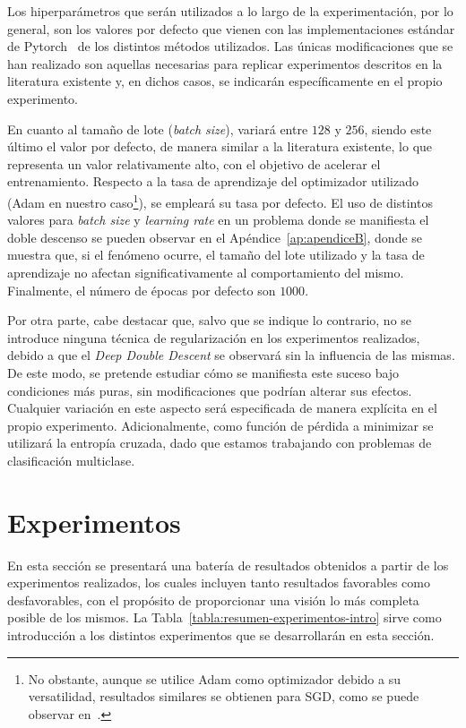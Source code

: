 Los hiperparámetros que serán utilizados a lo largo de la experimentación, por lo general, son los valores por defecto que vienen con las implementaciones estándar de Pytorch~\cite{NEURIPS2019_9015} de los distintos métodos utilizados. Las únicas modificaciones que se han realizado son aquellas necesarias para replicar experimentos descritos en la literatura existente y, en dichos casos, se indicarán específicamente en el propio experimento.

En cuanto al tamaño de lote (\textit{batch size}), variará entre $128$ y $256$, siendo este último el valor por defecto, de manera similar a la literatura existente, lo que representa un valor relativamente alto, con el objetivo de acelerar el entrenamiento. Respecto a la tasa de aprendizaje del optimizador utilizado (Adam en nuestro caso\footnote{No obstante, aunque se utilice Adam como optimizador debido a su versatilidad, resultados similares se obtienen para SGD, como se puede observar en~\cite{Nakkiran2019}.}), se empleará su tasa por defecto. El uso de distintos valores para \textit{batch size} y \textit{learning rate} en un problema donde se manifiesta el doble descenso se pueden observar en el Apéndice~\ref{ap:apendiceB}, donde se muestra que, si el fenómeno ocurre, el tamaño del lote utilizado y la tasa de aprendizaje no afectan significativamente al comportamiento del mismo. Finalmente, el número de épocas por defecto son $1000$.

Por otra parte, cabe destacar que, salvo que se indique lo contrario, no se introduce ninguna técnica de regularización en los experimentos realizados, debido a que el \textit{Deep Double Descent} se observará sin la influencia de las mismas. De este modo, se pretende estudiar cómo se manifiesta este suceso bajo condiciones más puras, sin modificaciones que podrían alterar sus efectos. Cualquier variación en este aspecto será especificada de manera explícita en el propio experimento. Adicionalmente, como función de pérdida a minimizar se utilizará la entropía cruzada, dado que estamos trabajando con problemas de clasificación multiclase.

\section{Experimentos}\label{sec:experimentos}

En esta sección se presentará una batería de resultados obtenidos a partir de los experimentos realizados, los cuales incluyen tanto resultados favorables como desfavorables, con el propósito de proporcionar una visión lo más completa posible de los mismos. La Tabla~\ref{tabla:resumen-experimentos-intro} sirve como introducción a los distintos experimentos que se desarrollarán en esta sección.

